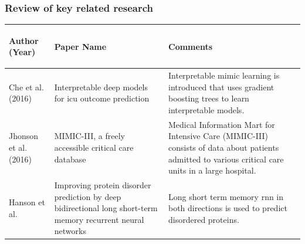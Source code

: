 \documentclass{beamer}
\begin{document}
\begin{frame}\frametitle{Review of key related research}
\begin{tabular}{ | p{1.5cm} | p{3.8cm} | p{5cm}| } 

\hline 
{\bf \begin{center} \footnotesize{Author (Year)} \end{center}} & {\bf \begin{center} \footnotesize{Paper Name} \end{center}} & {\bf \begin{center} \footnotesize{Comments} \end{center}} \\
\hline
\footnotesize{Che et al.(2016)} & \footnotesize{Interpretable deep models for icu outcome prediction} & \footnotesize{Interpretable mimic learning is introduced that uses gradient boosting trees to learn interpretable models.}\\

\hline
\footnotesize{Jhonson et al. (2016) }& \footnotesize{MIMIC-III, a freely accessible critical care database} & \footnotesize{Medical Information Mart for Intensive Care (MIMIC-III) consists of data about patients admitted to various critical care units in a large hospital.} \\ 
\hline

\footnotesize{Hanson et al.} & \footnotesize{Improving protein disorder prediction by deep bidirectional long short-term memory recurrent neural networks} & \footnotesize{Long short term memory rnn in both directions is used to predict disordered proteins.}\\
\hline
\end{tabular}
\end{frame}
\end{document}
